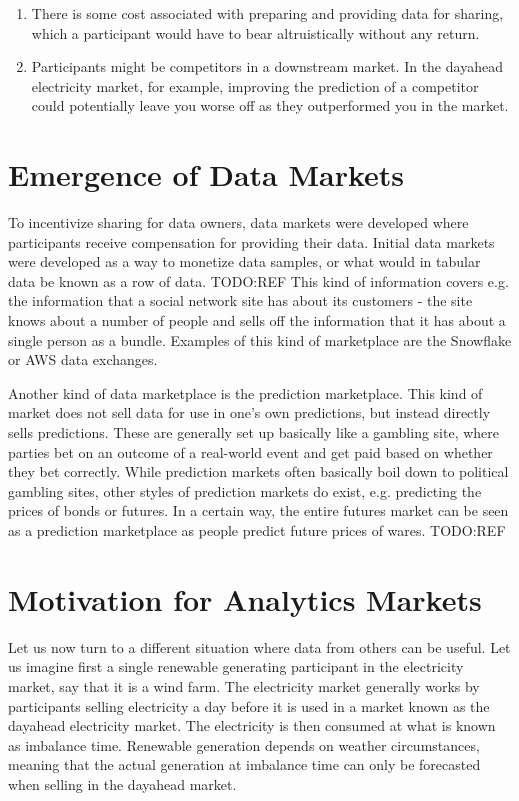 \begin{enumerate}
  \item There is some cost associated with preparing and providing data for
    sharing, which a participant would have to bear altruistically without any
    return.
  \item Participants might be competitors in a downstream market. In
    the dayahead electricity market, for example, improving the prediction of a
    competitor could potentially leave you worse off as they outperformed you
    in the market.
\end{enumerate}


\section{Emergence of Data Markets}
To incentivize sharing for data owners, data markets were developed where
participants receive compensation for providing their data. Initial data
markets were developed as a way to monetize data samples, or what would in
tabular data be known as a row of data. TODO:REF This kind of information
covers e.g. the information that a social network site has about its customers
- the site knows about a number of people and sells off the information that it
has about a single person as a bundle. Examples of this kind of marketplace are
the Snowflake or AWS data exchanges.

Another kind of data marketplace is the prediction marketplace. This kind of
market does not sell data for use in one's own predictions, but instead directly
sells predictions. These are generally set up basically like a gambling site,
where parties bet on an outcome of a real-world event and get paid based on
whether they bet correctly. While prediction markets often basically boil down
to political gambling sites, other styles of prediction markets do exist, e.g.
predicting the prices of bonds or futures. In a certain way, the entire futures
market can be seen as a prediction marketplace as people predict future prices
of wares. TODO:REF

\section{Motivation for Analytics Markets}

Let us now turn to a different situation where data from others can be useful.
Let us imagine first a single renewable generating participant in the
electricity market, say that it is a wind farm. The electricity market
generally works by participants selling electricity a day before it is
used in a market known as the dayahead electricity market. The electricity is then
consumed at what is known as imbalance time. Renewable generation depends on
weather circumstances, meaning that the actual generation at imbalance time can
only be forecasted when selling in the dayahead market.

